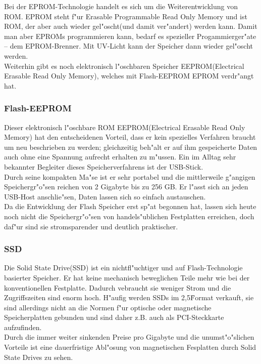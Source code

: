 					Bei der EPROM-Technologie handelt es sich um die Weiterentwicklung von ROM. EPROM steht f"ur \glqq Erasable Programmable Read Only Memory\grqq{} und ist ROM, der aber auch wieder gel"oscht(und damit ver"andert) werden kann. Damit man aber EPROMs programmieren kann, bedarf es spezieller Progammierger"ate – dem \glqq EPROM-Brenner\grqq{}. Mit UV-Licht kann der Speicher dann wieder gel"oscht werden.
					\\
					Weiterhin gibt es noch elektronisch l"oschbaren Speicher EEPROM(\glqq Electrical Erasable Read Only Memory\grqq{}), welches mit Flash-EEPROM EPROM verdr"angt hat.
				
				\subsubsection{Flash-EEPROM}
				\label{ch:Technisch:sec:Elektronische Speicherung:sub:Fl"uchtig:subsub:Flash-EEPROM}
				
					Dieser elektronisch l"oschbare ROM EEPROM(\glqq Electrical Erasable Read Only Memory\grqq{}) hat den entscheidenen Vorteil, dass er kein spezielles Verfahren braucht um neu beschrieben zu werden; gleichzeitig beh"alt er auf ihm gespeicherte Daten auch ohne eine Spannung aufrecht erhalten zu m"ussen. Ein im Alltag sehr bekannter Begleiter dieses Speicherverfahrens ist der USB-Stick. 
					\\
					Durch seine kompakten Ma"se ist er sehr portabel und die mittlerweile g"angigen Speichergr"o"sen reichen von 2 Gigabyte bis zu 256 GB. Er l"asst sich an jeden USB-Host anschlie"sen, Daten lassen sich so einfach austauschen. 
					\\
					Da die Entwicklung der Flash Speicher erst sp"at begonnen hat, lassen sich heute noch nicht die Speichergr"o"sen von handels"ublichen Festplatten erreichen, doch daf"ur sind sie stromsparender und deutlich praktischer.
				
				\subsubsection{SSD}
				\label{ch:Technisch:sec:Elektronische Speicherung:sub:Fl"uchtig:subsub:SSD}
				
				Die Solid State Drive(SSD) ist ein nichtfl"uchtiger und auf Flash-Technologie basierter Speicher. Er hat keine mechanisch beweglichen Teile mehr wie bei der konventionellen Festplatte. Dadurch vebraucht sie weniger Strom und die Zugriffszeiten sind enorm hoch. H"aufig werden SSDs im 2,5\" Format verkauft, sie sind allerdings nicht an die Normen f"ur optische oder magnetische Speicherplatten gebunden und sind daher z.B. auch als PCI-Steckkarte aufzufinden.
				\\
				Durch die immer weiter sinkenden Preise pro Gigabyte und die unumst"o"slichen Vorteile ist eine dauerfristige Abl"osung von magnetischen Fesplatten durch Solid State Drives zu sehen.
				
